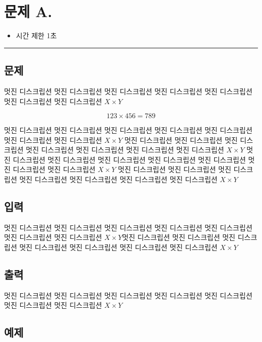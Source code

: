 \newpage
\section*{{\Large 문제 A.} }

\begin{itemize}
    \item 시간 제한 \tabto{2cm} 1초
\end{itemize}

\hrule

\subsection*{문제}

멋진 디스크립션 멋진 디스크립션 멋진 디스크립션 멋진 디스크립션 멋진 디스크립션 멋진 디스크립션 멋진 디스크립션 $X\times Y$

$$123\times456=789$$

멋진 디스크립션 멋진 디스크립션 멋진 디스크립션 멋진 디스크립션 멋진 디스크립션 멋진 디스크립션 멋진 디스크립션 $X\times Y$ 멋진 디스크립션 멋진 디스크립션 멋진 디스크립션 멋진 디스크립션 멋진 디스크립션 멋진 디스크립션 멋진 디스크립션 $X\times Y$ 멋진 디스크립션 멋진 디스크립션 멋진 디스크립션 멋진 디스크립션 멋진 디스크립션 멋진 디스크립션 멋진 디스크립션 $X\times Y$ 멋진 디스크립션 멋진 디스크립션 멋진 디스크립션 멋진 디스크립션 멋진 디스크립션 멋진 디스크립션 멋진 디스크립션 $X\times Y$

\subsection*{입력}

멋진 디스크립션 멋진 디스크립션 멋진 디스크립션 멋진 디스크립션 멋진 디스크립션 멋진 디스크립션 멋진 디스크립션 $X\times Y$멋진 디스크립션 멋진 디스크립션 멋진 디스크립션 멋진 디스크립션 멋진 디스크립션 멋진 디스크립션 멋진 디스크립션 $X\times Y$

\subsection*{출력}

멋진 디스크립션 멋진 디스크립션 멋진 디스크립션 멋진 디스크립션 멋진 디스크립션 멋진 디스크립션 멋진 디스크립션 $X\times Y$

\subsection*{예제}

